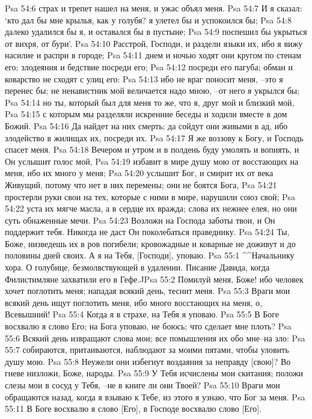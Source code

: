 Psa 54:6  страх и трепет нашел на меня, и ужас объял меня.
Psa 54:7  И я сказал: `кто дал бы мне крылья, как у голубя? я улетел бы и успокоился бы;
Psa 54:8  далеко удалился бы я, и оставался бы в пустыне;
Psa 54:9  поспешил бы укрыться от вихря, от бури'.
Psa 54:10  Расстрой, Господи, и раздели языки их, ибо я вижу насилие и распри в городе;
Psa 54:11  днем и ночью ходят они кругом по стенам его; злодеяния и бедствие посреди его;
Psa 54:12  посреди его пагуба; обман и коварство не сходят с улиц его:
Psa 54:13  ибо не враг поносит меня, --это я перенес бы; не ненавистник мой величается надо мною, --от него я укрылся бы;
Psa 54:14  но ты, который был для меня то же, что я, друг мой и близкий мой,
Psa 54:15  с которым мы разделяли искренние беседы и ходили вместе в дом Божий.
Psa 54:16  Да найдет на них смерть; да сойдут они живыми в ад, ибо злодейство в жилищах их, посреди их.
Psa 54:17  Я же воззову к Богу, и Господь спасет меня.
Psa 54:18  Вечером и утром и в полдень буду умолять и вопиять, и Он услышит голос мой,
Psa 54:19  избавит в мире душу мою от восстающих на меня, ибо их много у меня;
Psa 54:20  услышит Бог, и смирит их от века Живущий, потому что нет в них перемены; они не боятся Бога,
Psa 54:21  простерли руки свои на тех, которые с ними в мире, нарушили союз свой;
Psa 54:22  уста их мягче масла, а в сердце их вражда; слова их нежнее елея, но они суть обнаженные мечи.
Psa 54:23  Возложи на Господа заботы твои, и Он поддержит тебя. Никогда не даст Он поколебаться праведнику.
Psa 54:24  Ты, Боже, низведешь их в ров погибели; кровожадные и коварные не доживут и до половины дней своих. А я на Тебя, [Господи], уповаю.
Psa 55:1  ^^Начальнику хора. О голубице, безмолвствующей в удалении. Писание Давида, когда Филистимляне захватили его в Гефе.^^
Psa 55:2  Помилуй меня, Боже! ибо человек хочет поглотить меня; нападая всякий день, теснит меня.
Psa 55:3  Враги мои всякий день ищут поглотить меня, ибо много восстающих на меня, о, Всевышний!
Psa 55:4  Когда я в страхе, на Тебя я уповаю.
Psa 55:5  В Боге восхвалю я слово Его; на Бога уповаю, не боюсь; что сделает мне плоть?
Psa 55:6  Всякий день извращают слова мои; все помышления их обо мне--на зло:
Psa 55:7  собираются, притаиваются, наблюдают за моими пятами, чтобы уловить душу мою.
Psa 55:8  Неужели они избегнут воздаяния за неправду [свою]? Во гневе низложи, Боже, народы.
Psa 55:9  У Тебя исчислены мои скитания; положи слезы мои в сосуд у Тебя, --не в книге ли они Твоей?
Psa 55:10  Враги мои обращаются назад, когда я взываю к Тебе, из этого я узнаю, что Бог за меня.
Psa 55:11  В Боге восхвалю я слово [Его], в Господе восхвалю слово [Его].

